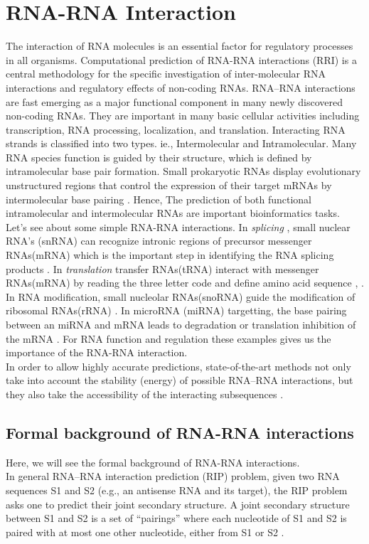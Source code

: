 \documentclass[twoside,a4paper]{report}
\begin{document}
	
	\section{RNA-RNA Interaction}
 	The interaction of RNA molecules is an essential factor for regulatory processes in all organisms. Computational prediction of RNA-RNA interactions (RRI) is a central methodology for the specific investigation of inter-molecular RNA interactions and regulatory effects of non-coding RNAs. RNA–RNA interactions are fast emerging as a major functional component in many newly discovered non-coding RNAs. They are important in many basic cellular activities including transcription, RNA processing, localization, and translation. Interacting RNA strands is classified into two types. ie., Intermolecular and Intramolecular. Many RNA species function is guided by their structure, which is defined by intramolecular base pair formation. Small prokaryotic RNAs display evolutionary unstructured regions that control the expression of their target mRNAs by intermolecular base pairing \citep{wright2013comparative}. Hence, The prediction of both functional intramolecular and intermolecular RNAs are important bioinformatics tasks. \\
 	
 	Let's see about some simple RNA-RNA interactions. In \textit{splicing} , small nuclear RNA's (snRNA) can recognize intronic regions of precursor messenger RNAs(mRNA) which is the important step in identifying the RNA splicing products \citep{modrek2002genomic}. In \textit{translation} transfer RNAs(tRNA) interact with messenger RNAs(mRNA) by reading the three letter code and define amino acid sequence \citep{selmer2006structure}, \citep{ibba2000aminoacyl}. In RNA modification, small nucleolar RNAs(snoRNA) guide the modification of ribosomal RNAs(rRNA) \citep{kiss2002small}. In microRNA (miRNA) targetting, the base pairing between an miRNA and mRNA leads to degradation or translation inhibition of the mRNA \citep{bartel2004micrornas}. For RNA function and regulation these examples gives us the importance of the RNA-RNA interaction. \\
 		
 	In order to allow highly accurate predictions, state-of-the-art methods not only take into account the stability (energy) of possible RNA–RNA interactions, but they also take the accessibility of the interacting subsequences \citep{umu2017comprehensive}.\\
 	
 	\subsection{Formal background of RNA-RNA interactions}
 	Here, we will see the formal background of RNA-RNA interactions.\\
 	In general RNA–RNA interaction prediction (RIP) problem, given two RNA sequences S1 and S2 (e.g., an antisense RNA and its target), the RIP problem asks one to predict their joint secondary structure. A joint secondary structure between S1 and S2 is a set of “pairings” where each nucleotide of S1 and S2 is paired with at most one other nucleotide, either from S1 or S2 \citep{alkan2006rna}.  \\
 	
\end{document}
